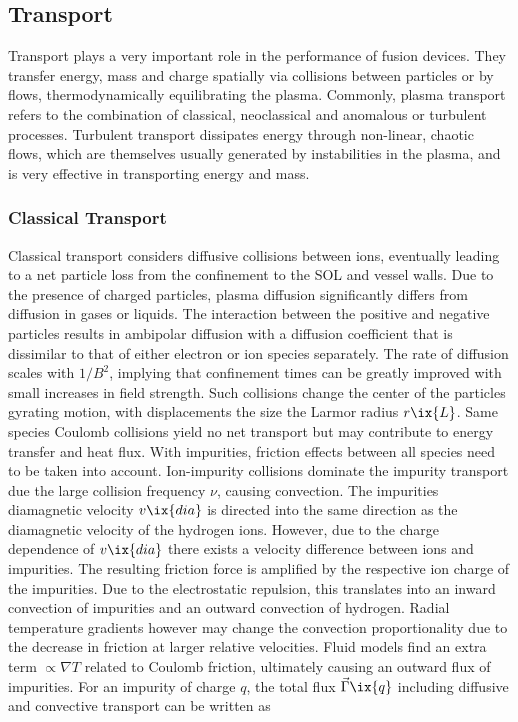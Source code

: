         \subsection{Transport}\label{subsec:tranport}%
%
            Transport plays a very important role in the performance of fusion devices. They transfer energy, mass and charge spatially via collisions between particles or by flows, thermodynamically equilibrating the plasma. Commonly, plasma transport refers to the combination of classical, neoclassical and anomalous or turbulent processes. Turbulent transport dissipates energy through non-linear, chaotic flows, which are themselves usually generated by instabilities in the plasma, and is very effective in transporting energy and mass.%
%
            \subsubsection*{Classical Transport}%
%
                Classical transport considers diffusive collisions between ions, eventually leading to a net particle loss from the confinement to the SOL and vessel walls. Due to the presence of charged particles, plasma diffusion significantly differs from diffusion in gases or liquids. The interaction between the positive and negative particles results in ambipolar diffusion with a diffusion coefficient that is dissimilar to that of either electron or ion species separately. The rate of diffusion scales with $1/B^{2}$, implying that confinement times can be greatly improved with small increases in field strength. Such collisions change the center of the particles gyrating motion, with displacements the size the Larmor radius $r\ix{L}$. Same species Coulomb collisions yield no net transport but may contribute to energy transfer and heat flux. With impurities, friction effects between all species need to be taken into account. Ion-impurity collisions dominate the impurity transport due the large collision frequency $\nu$, causing convection. The impurities diamagnetic velocity $v\ix{dia}$ is directed into the same direction as the diamagnetic velocity of the hydrogen ions. However, due to the charge dependence of $v\ix{dia}$ there exists a velocity difference between ions and impurities. The resulting friction force is amplified by the respective ion charge of the impurities. Due to the electrostatic repulsion, this translates into an inward convection of impurities and an outward convection of hydrogen. Radial temperature gradients however may change the convection proportionality due to the decrease in friction at larger relative velocities. Fluid models find an extra term $\propto\nabla T$ related to Coulomb friction, ultimately causing an outward flux of impurities. For an impurity of charge $q$, the total flux $\vec{\Gamma}\ix{q}$ including diffusive and convective transport can be written as%


